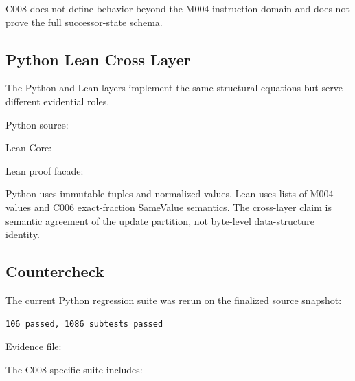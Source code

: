 C008 does not define behavior beyond the M004 instruction domain and
does not prove the full successor-state schema.

\subsection{Python Lean Cross Layer}\label{python-lean-cross-layer-10}

The Python and Lean layers implement the same structural equations but
serve different evidential roles.

Python source:

\texttt{\protect{}}

Lean Core:

\texttt{\protect{}}

Lean proof facade:

\texttt{\protect{}}

Python uses immutable tuples and normalized \texttt{\protect{}} values.
Lean uses lists of M004 \texttt{\protect{}} values and C006
exact-fraction SameValue semantics. The cross-layer claim is semantic
agreement of the update partition, not byte-level data-structure
identity.

\subsection{Countercheck}\label{countercheck-10}

The current Python regression suite was rerun on the finalized source
snapshot:

\begin{verbatim}
106 passed, 1086 subtests passed
\end{verbatim}

Evidence file:

\texttt{\protect{}}

The C008-specific suite includes:

